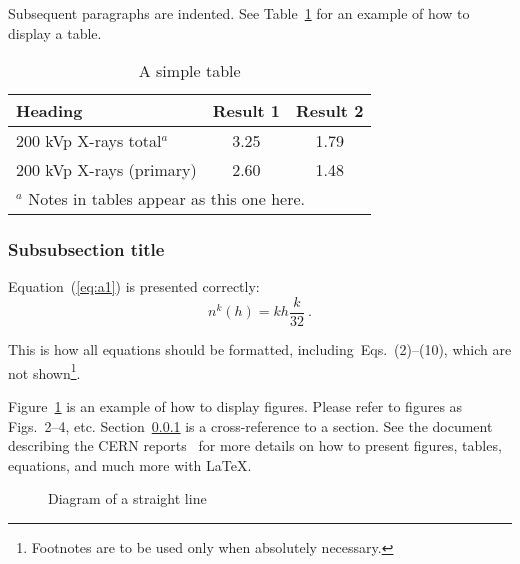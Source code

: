 Subsequent paragraphs are indented. See Table~\ref{tab:LET} for an
example of how to display a table.

\begin{table}[h]
\begin{center}
\caption{A simple table}
\label{tab:LET}
\begin{tabular}{p{6cm}cc}
\hline\hline
\textbf{Heading}             & \textbf{Result 1}
                                                & \textbf{Result 2}\\
\hline
200 kVp X-rays total$^{a}$   & 3.25             & 1.79 \\
200 kVp X-rays (primary)     & 2.60             & 1.48 \\
\hline\hline
\multicolumn{3}{l}{$^{a}$ \footnotesize Notes in tables appear as
                      this one here.}
\end{tabular}
\end{center}
\end{table}

\subsubsection{Subsubsection title}
\label{sec:sss}

Equation~(\ref{eq:a1}) is presented correctly:
\begin{equation}
n^k(h)= k h \frac{k}{32}~. \label{eq:a1}  
\end{equation}

This is how all equations should be formatted,
including~Eqs.~(2)--(10), 
which are not shown\footnote{Footnotes are
to be used only when absolutely necessary.}.


Figure~\ref{tab:LET} is an example of how to display figures. Please
refer to figures as Figs.~2--4, etc.
Section~\ref{sec:sss} is a cross-reference to a section. 
See the document describing the CERN reports~\cite{cernrep} for more
details on how to present figures, tables, equations, and much more
with \LaTeX. 

\begin{figure}[ht]
\begin{center}
\caption{Diagram of a straight line}
\label{fig:line}
\end{center}
\end{figure}

